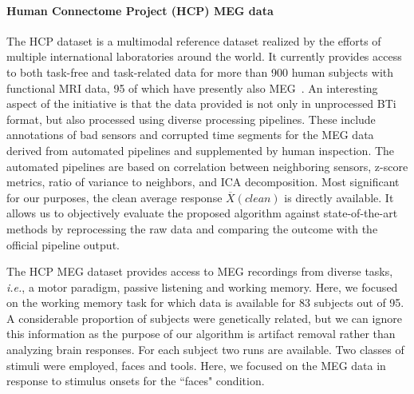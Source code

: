 \paragraph{Human Connectome Project (HCP) MEG data}

The HCP dataset is a multimodal reference dataset realized by the efforts of multiple international laboratories around the world. It currently provides access to both task-free and task-related data for more than 900 human subjects with functional MRI data, 95 of which have presently also MEG~\citep{larson2013adding}. An interesting aspect of the initiative is that the data provided is not only in unprocessed BTi format, but also processed using diverse processing pipelines. These include annotations of bad sensors and corrupted time segments for the MEG data derived from automated pipelines and supplemented by human inspection. The automated pipelines are based on correlation between neighboring sensors, z-score metrics, ratio of variance to neighbors, and ICA decomposition. Most significant for our purposes, the clean average response $\overbar{X}(clean)$ is directly available. It allows us to objectively evaluate the proposed algorithm against state-of-the-art methods by reprocessing the raw data and comparing the outcome with the official pipeline output.

The HCP MEG dataset provides access to MEG recordings from diverse tasks, \textit{i.e.}, a motor paradigm, passive listening and working memory. Here, we focused on the working memory task for which data is available for 83 subjects out of 95. A considerable proportion of subjects were genetically related, but we can ignore this information as the purpose of our algorithm is artifact removal rather than analyzing brain responses. For each subject two runs are available. Two classes of stimuli were employed, faces and tools. Here, we focused on the MEG data in response to stimulus onsets for the ``faces" condition.

